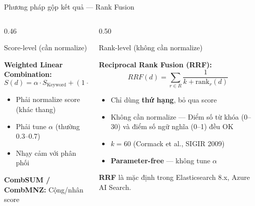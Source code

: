 \documentclass[aspectratio=169, 11pt]{beamer}
\begin{document}
\begin{frame}{Phương pháp gộp kết quả --- Rank Fusion}
\begin{columns}[T]
\begin{column}{0.46\textwidth}

\begin{alertblock}{Score-level {\scriptsize (cần normalize)}}
{\scriptsize
\textbf{Weighted Linear Combination:}
\[
S(d) = \alpha \cdot S_{\text{Keyword}} + (1{-}\alpha) \cdot S_{\text{Semantic}}
\]
\begin{itemize}
    \item Phải normalize score (khác thang)
    \item Phải tune $\alpha$ (thường 0.3--0.7)
    \item Nhạy cảm với phân phối
\end{itemize}
\textbf{CombSUM / CombMNZ:} Cộng/nhân score
}
\end{alertblock}

\end{column}
\begin{column}{0.50\textwidth}

\begin{exampleblock}{Rank-level {\scriptsize (không cần normalize)}}
{\scriptsize
\textbf{Reciprocal Rank Fusion (RRF):}
\[
\boxed{RRF(d) = \sum_{r \in R} \frac{1}{k + \text{rank}_r(d)}}
\]

\begin{itemize}
    \item Chỉ dùng \textbf{thứ hạng}, bỏ qua score
    \item Không cần normalize --- Điểm số từ khóa (0--30) và điểm số ngữ nghĩa (0--1) đều OK
    \item $k = 60$ (Cormack et al., SIGIR 2009)
    \item \textbf{Parameter-free} --- không tune $\alpha$
\end{itemize}
}
\end{exampleblock}

\vspace{0.15cm}
{\small\textcolor{accentTeal}{\textbf{RRF} là mặc định trong Elasticsearch 8.x, Azure AI Search.}}

\end{column}
\end{columns}
\end{frame}
\end{document}
